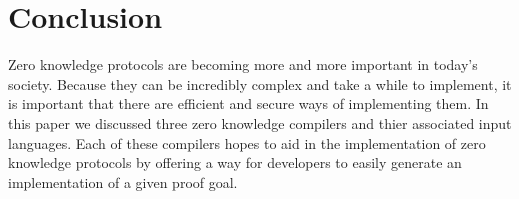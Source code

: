 \documentclass{sig-alternate}
\begin{document}
\begin{comment}
	Almeida et al. describe briefly in~\cite{ZKCrypt:2012} how ZKCrypt can be used to
	generate a proof for proving the identity of the user when withdrawing money from
	a bank account. The user has to prove they have a secret key in order to successfully
	withdraw money. 
	
	The authors state the proof goal as:
	\begin{align*}
	ZPK\left[(u_{1}, u_{2}): I = g^{u_{1}}_{1}g^{u_{2}}_{2}\right].
	\end{align*}
	In this goal, $I, g_{1}, g_{2} \in \mathbb{Z}^{*}_{p}$ such that ord $g_{1}$ = ord
	$g_{2}$ = $q$, where $q|(p - 1)$ and $p, q \in \mathbb{P}$. The secrets $u_{1}, u_{2}$
	are elements of $\mathbb{Z}_{q}$. A single instance of the $\Sigma^{\Phi}$-protocol
	is enough to realize this goal.
	
	Meiklejohn et al. also give this example, a user proving their identity to the bank,
	implemented in ZKDPL. The program for this looks like: 
	\begin{verbatim}
	proof:
	  given:
	  	group: cashGroup = <f, g, h, h1, h2>
	  	elements in cashGroup: A, pk_u
	  	  commitment to sk_u: A = g^sk_u * h^r_u
	  prove knowledge of:
	  	exponents in cashGroup: sk_u, r_u
	  such that:
	  	pk_u = g^sk_u
	  	A = g^sk_u * h^r_u
	\end{verbatim}
	
	When the bank has verified this proof, the bank and the user will run a protocol
	which defines a wallet which contains $W$ coins, where $W$ is a system-wide
	public parameter. When a user spends a coin, it is split up into two parts: an
	endorsed part and an unendorsed part. Separately the two parts are worthless, but
	together the coin becomes valid. First the unendorsed part is sent to the vendor
	who proves its validity. The vendor then sends what the buyer has purchased. The
	buyer sends the endorsed portion of the coin to the vendor upon receiving their
	product.
	
	\end{comment}

\section{Conclusion}
	Zero knowledge protocols are becoming more and more important in today's society. 
	Because they can be incredibly complex and take a while to implement, it is important 
	that there are efficient and secure ways of implementing them. In this paper we discussed
	three zero knowledge compilers and thier associated input languages. Each of these compilers
	hopes to aid in the implementation of zero knowledge protocols by offering a way for
	developers to easily generate an implementation of a given proof goal.
	
\end{document}
